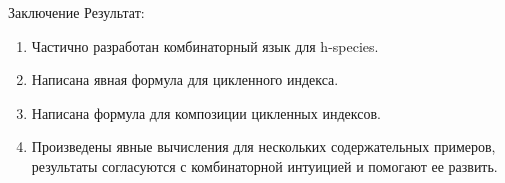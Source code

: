 \documentclass{beamer}
\begin{document}
\begin{frame}{Заключение}
Результат:
\begin{enumerate}[*]
\item Частично разработан комбинаторный язык для h-species.
\item Написана явная формула для цикленного индекса.
\item Написана формула для композиции цикленных индексов.
\item Произведены явные вычисления для нескольких содержательных примеров,
результаты согласуются с комбинаторной интуицией и помогают ее развить.
\end{enumerate}
\end{frame}
\end{document}
